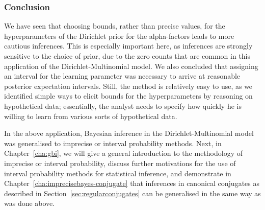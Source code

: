 \subsubsection{Conclusion}

We have seen that choosing bounds, rather than precise values,
for the hyperparameters of the Dirichlet prior for the alpha-factors
leads to more cautious inferences.
This is especially important here,
as inferences are strongly sensitive to the choice of prior,
due to the zero counts that are common in this application of the Dirichlet-Multinomial model.
We also concluded that assigning an interval for the learning parameter was necessary
to arrive at reasonable posterior expectation intervals.
Still, the method is relatively easy to use, as
we identified simple ways to elicit bounds for the hyperparameters
by reasoning on hypothetical data;
essentially, the analyst needs to specify how quickly he is willing to learn
from various sorts of hypothetical data.

\medskip

In the above application, Bayesian inference in the Dirichlet-Multinomial model
was generalised to imprecise or interval probability methods.
Next, in Chapter~\ref{cha:gbi},
we will give a general introduction to the methodology of imprecise or interval probability,
discuss further motivations for the use of interval probability methods for statistical inference,
and demonstrate in Chapter~\ref{cha:imprecisebayes-conjugate} that inferences in canonical conjugates
as described in Section~\ref{sec:regularconjugates}
can be generalised in the same way as was done above.
